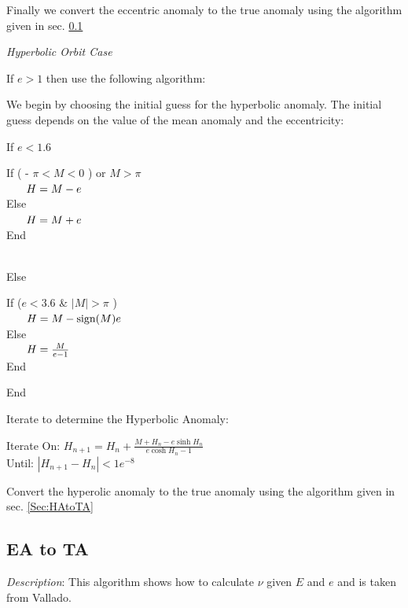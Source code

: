 \noindent Finally we convert the eccentric anomaly to the true
anomaly using the algorithm given in sec. \ref{Sec:EAtoTA}

\noindent \textit{Hyperbolic Orbit Case}

\noindent If  $e > 1$ then use the following algorithm:

We begin by choosing the initial guess for the hyperbolic anomaly.
The initial guess depends on the value of the mean anomaly and the
eccentricity:

\noindent If $e < 1.6$

\begin{minipage}{2.0 in}
\noindent If ( - $\pi < M < 0$ ) or $M > \pi$\\
%
$\mbox{}\hspace{ .25 in} H = M - e$ \\
%
Else\\
%
$\mbox{}\hspace{ .25 in} H = M + e$ \\
%
End
%
\end{minipage}\\

\noindent Else

\begin{minipage}{2.25 in}
\noindent If ($ e < 3.6$ \& $|M|>\pi$ ) \\
%
$\mbox{}\hspace{ .25 in} H = M - \mbox{sign}(M)e$ \\
%
Else\\
%
$\mbox{}\hspace{ .25 in} H = \frac{M}{e-1}$ \\
%
End
%
\end{minipage}

\noindent End

\noindent Iterate to determine the Hyperbolic Anomaly:

\noindent Iterate On: $H_{n+1} = H_{n} + \displaystyle\frac{M + H_n
-
e\sinh{H}_n }{e\cosh{H_n} - 1}$ \\
Until:  $| H_{n+1} - H_n | < 1e^{-8}$

\noindent Convert the hyperolic anomaly to the true anomaly using
the algorithm given in sec. \ref{Sec:HAtoTA}


\subsection{EA to TA} \label{Sec:EAtoTA}

\noindent \textit{Description}: This algorithm shows how to
calculate $\nu$ given $E$ and $e$ and is taken from
Vallado\cite{vallado2}.

